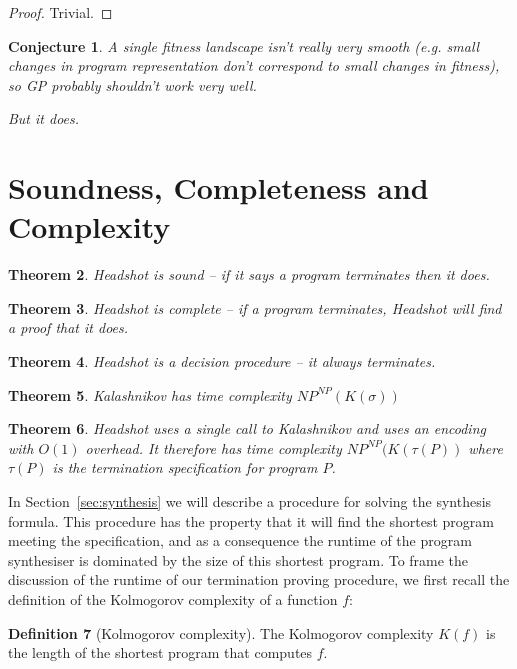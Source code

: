 \documentclass[preprint]{sigplanconf}
\newtheorem{theorem}{Theorem}
\newtheorem{conjecture}[theorem]{Conjecture}
\theoremstyle{definition}
\newtheorem{definition}[theorem]{Definition}
\begin{document}
\begin{proof}
 Trivial.
\end{proof}


\begin{conjecture}
 A single fitness landscape isn't really very smooth (e.g. small changes in program representation
 don't correspond to small changes in fitness), so GP probably shouldn't work very well.

 But it does.
\end{conjecture}


\section{Soundness, Completeness and Complexity}
\begin{theorem}
 {\sc Headshot} is sound -- if it says a program terminates then it does.
\end{theorem}

\begin{theorem}
 {\sc Headshot} is complete -- if a program terminates, {\sc Headshot} will find a proof that it does.
\end{theorem}

\begin{theorem}
 {\sc Headshot} is a decision procedure -- it always terminates.
\end{theorem}

\begin{theorem}
 {\sc Kalashnikov} has time complexity $NP^{NP}(K(\sigma))$
\end{theorem}

\begin{theorem}
 {\sc Headshot} uses a single call to {\sc Kalashnikov} and uses an encoding with $O(1)$
 overhead.  It therefore has time complexity $NP^{NP}(K(\tau(P))$ where $\tau(P)$ is the
 termination specification for program $P$.
\end{theorem}




In Section~\ref{sec:synthesis} we will describe a procedure for solving the synthesis formula.
This procedure has the property that it will find the shortest program meeting the
specification, and as a consequence the runtime of the program synthesiser is dominated
by the size of this shortest program.  To frame the discussion of the runtime of our
termination proving procedure, we first recall the definition of the Kolmogorov complexity
of a function $f$:

\begin{definition}[Kolmogorov complexity]
 The Kolmogorov complexity $K(f)$ is the length of the shortest program that
 computes $f$.
\end{definition}
\end{document}
